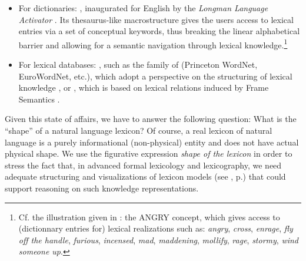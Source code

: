 \begin{itemize}

\item For dictionaries: , inaugurated for English by the \textit{Longman Language Activator} \parencite{LongmanActivator1993}. Its thesaurus-like macrostructure gives the users access to lexical entries via a set of conceptual keywords, thus breaking the linear alphabetical barrier and allowing for a semantic navigation through lexical knowledge.\footnote{Cf. the illustration given in \textcite[176]{RundellHam1994}: the ANGRY concept, which gives access to (dictionnary entries for) lexical realizations such as: \textit{angry}, \textit{cross}, \textit{enrage}, \textit{fly off the handle}, \textit{furious}, \textit{incensed}, \textit{mad}, \textit{maddening}, \textit{mollify}, \textit{rage}, \textit{stormy}, \textit{wind someone up}.}

\item For lexical databases:  \parencite{Fontenelle2012}, such as the family of \mbox{} (Princeton WordNet, EuroWordNet, etc.), which adopt a  perspective on the structuring of lexical knowledge \parencite{Fellbaum1998}, or , which is based on lexical relations induced by Frame Semantics \parencite{FillmoreEtAl2003}.

\end{itemize}

Given this state of affairs, we have to answer the following question: What is the ``shape'' of a natural language lexicon? Of course, a real lexicon of natural language is a purely informational (non-physical) entity and does not have actual physical shape. We use the figurative expression \textit{shape of the lexicon} in order to stress the fact that, in advanced formal lexicology and lexicography, we need adequate structuring and visualizations of lexicon models (see , p.\thinspace\pageref{fig:taxonomicNonTaxonomicLNs}) that could support reasoning on such knowledge representations.

